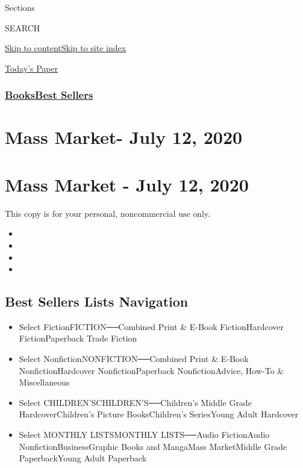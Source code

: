 Sections

SEARCH

\protect\hyperlink{site-content}{Skip to
content}\protect\hyperlink{site-index}{Skip to site index}

\href{https://myaccount.nytimes3xbfgragh.onion/auth/login?response_type=cookie\&client_id=vi}{}

\href{https://www.nytimes3xbfgragh.onion/section/todayspaper}{Today's
Paper}

\hypertarget{booksbest-sellers}{%
\subsubsection{\texorpdfstring{\href{/section/books/}{Books}\textbar{}\href{/books/best-sellers/}{Best
Sellers}}{Books\textbar{}Best Sellers}}\label{booksbest-sellers}}

\hypertarget{mass-market--july-12-2020}{%
\section{Mass Market- July 12, 2020}\label{mass-market--july-12-2020}}

\hypertarget{mass-market---july-12-2020}{%
\section{Mass Market - July 12, 2020}\label{mass-market---july-12-2020}}

This copy is for your personal, noncommercial use only.

\begin{itemize}
\item
\item
\item
\item
\end{itemize}

\hypertarget{best-sellers-lists-navigation}{%
\subsection{Best Sellers Lists
Navigation}\label{best-sellers-lists-navigation}}

\begin{itemize}
\tightlist
\item
  Select FictionFICTION──Combined Print \& E-Book FictionHardcover
  FictionPaperback Trade Fiction
\item
  Select NonfictionNONFICTION──Combined Print \& E-Book
  NonfictionHardcover NonfictionPaperback NonfictionAdvice, How-To \&
  Miscellaneous
\item
  Select CHILDREN'SCHILDREN'S──Children's Middle Grade
  HardcoverChildren's Picture BooksChildren's SeriesYoung Adult
  Hardcover
\item
  Select MONTHLY LISTSMONTHLY LISTS──Audio FictionAudio
  NonfictionBusinessGraphic Books and MangaMass MarketMiddle Grade
  PaperbackYoung Adult Paperback
\end{itemize}

